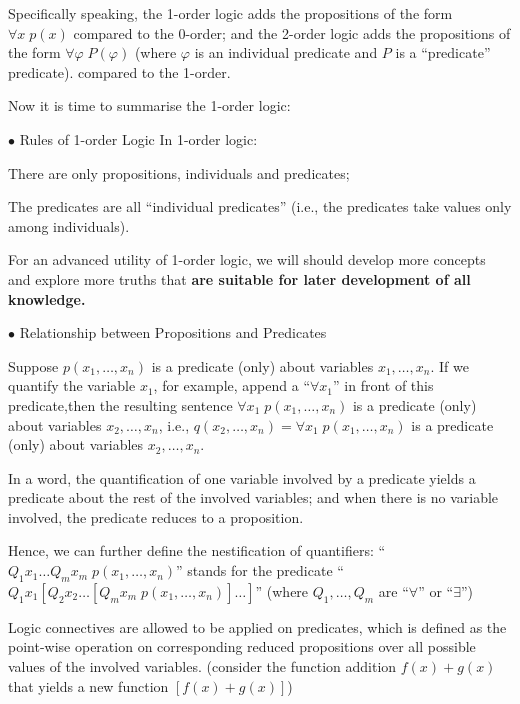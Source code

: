 \documentclass{article}
\begin{document}
Specifically speaking, the 1-order logic adds the propositions of the form $\forall x \; p(x)$ compared to the 0-order; and the 2-order logic adds the propositions of the form $\forall \varphi \; P(\varphi)$ (where $\varphi$ is an individual predicate and $P$ is a ``predicate'' predicate). compared to the 1-order.

Now it is time to summarise the 1-order logic:

\begin{Tr}{$\bullet$ Rules of 1-order Logic}
    In 1-order logic:
    \begin{compactenum}
        \item There are only propositions, individuals and predicates;
        \item The predicates are all ``individual predicates'' (i.e., the predicates take values only among individuals).
    \end{compactenum}
\end{Tr}

For an advanced utility of 1-order logic, we will should develop more concepts and explore more truths that \textbf{are suitable for later development of all knowledge.}

\begin{Spec}{$\bullet$ Relationship between Propositions and Predicates}
    \begin{compactitem}
        \item Suppose $p(x_1, \dots, x_n)$ is a predicate (only) about variables $x_1, \dots, x_n$. If we quantify the variable $x_1$, for example, append a ``$\forall x_1$'' in front of this predicate,then the resulting sentence $\forall x_1 \; p(x_1, \dots, x_n)$ is a predicate (only) about variables $x_2, \dots, x_n$, i.e., $q(x_2, \dots, x_n) = \forall x_1 \; p(x_1, \dots, x_n)$ is a predicate (only) about variables $x_2, \dots, x_n$.
        \item In a word, \textcolor{Tr}{the quantification of one variable involved by a predicate yields a predicate about the rest of the involved variables; and when there is no variable involved, the predicate reduces to a proposition.}
        \item Hence, we can further define the nestification of quantifiers: \textcolor{Df}{``$Q_1 x_1\dots Q_m x_m \;p(x_1, \dots, x_n)$'' stands for the predicate ``$Q_1 x_1 [Q_2 x_2 \dots[Q_m x_m \; p(x_1, \dots, x_n)]\dots]$'' (where $Q_1, \dots, Q_m$ are ``$\forall$'' or ``$\exists$'')}
        \item \textcolor{Df}{Logic connectives are allowed to be applied on predicates, which is defined as the point-wise operation on corresponding reduced propositions over all possible values of the involved variables.} (consider the function addition $f(x)+g(x)$ that yields a new function $[f(x)+g(x)]$)
    \end{compactitem} 
\end{Spec}
\end{document}
